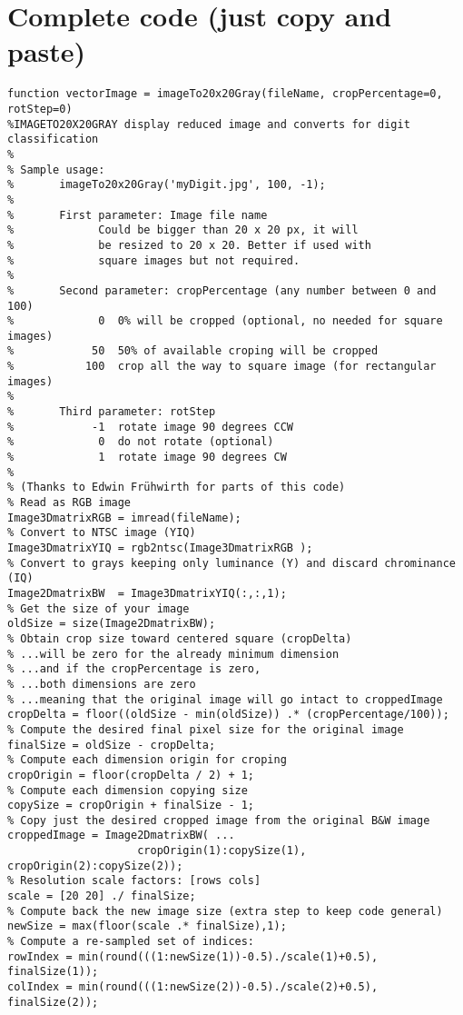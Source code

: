 \section{Complete code (just copy and paste)}
\begin{Verbatim}[fontsize=\small]
function vectorImage = imageTo20x20Gray(fileName, cropPercentage=0, rotStep=0)
%IMAGETO20X20GRAY display reduced image and converts for digit classification
%
% Sample usage: 
%       imageTo20x20Gray('myDigit.jpg', 100, -1);
%
%       First parameter: Image file name
%             Could be bigger than 20 x 20 px, it will
%             be resized to 20 x 20. Better if used with
%             square images but not required.
% 
%       Second parameter: cropPercentage (any number between 0 and 100)
%             0  0% will be cropped (optional, no needed for square images)
%            50  50% of available croping will be cropped
%           100  crop all the way to square image (for rectangular images)
% 
%       Third parameter: rotStep
%            -1  rotate image 90 degrees CCW
%             0  do not rotate (optional)
%             1  rotate image 90 degrees CW
%
% (Thanks to Edwin Frühwirth for parts of this code)
% Read as RGB image
Image3DmatrixRGB = imread(fileName);
% Convert to NTSC image (YIQ)
Image3DmatrixYIQ = rgb2ntsc(Image3DmatrixRGB );
% Convert to grays keeping only luminance (Y) and discard chrominance (IQ)
Image2DmatrixBW  = Image3DmatrixYIQ(:,:,1);
% Get the size of your image
oldSize = size(Image2DmatrixBW);
% Obtain crop size toward centered square (cropDelta)
% ...will be zero for the already minimum dimension
% ...and if the cropPercentage is zero, 
% ...both dimensions are zero
% ...meaning that the original image will go intact to croppedImage
cropDelta = floor((oldSize - min(oldSize)) .* (cropPercentage/100));
% Compute the desired final pixel size for the original image
finalSize = oldSize - cropDelta;
% Compute each dimension origin for croping
cropOrigin = floor(cropDelta / 2) + 1;
% Compute each dimension copying size
copySize = cropOrigin + finalSize - 1;
% Copy just the desired cropped image from the original B&W image
croppedImage = Image2DmatrixBW( ...
                    cropOrigin(1):copySize(1), cropOrigin(2):copySize(2));
% Resolution scale factors: [rows cols]
scale = [20 20] ./ finalSize;
% Compute back the new image size (extra step to keep code general)
newSize = max(floor(scale .* finalSize),1); 
% Compute a re-sampled set of indices:
rowIndex = min(round(((1:newSize(1))-0.5)./scale(1)+0.5), finalSize(1));
colIndex = min(round(((1:newSize(2))-0.5)./scale(2)+0.5), finalSize(2));

\end{Verbatim}
